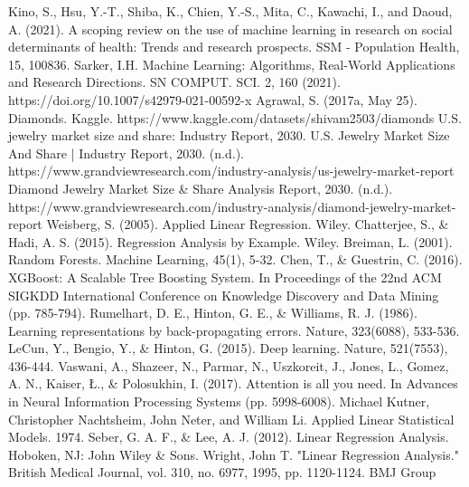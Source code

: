 \documentclass[conference]{IEEEtran}
\begin{document}
\begin{thebibliography}{00}
 Kino, S., Hsu, Y.-T., Shiba, K., Chien, Y.-S., Mita, C., Kawachi, I., and Daoud, A. (2021). A scoping review on the use of machine learning in research on social determinants of health: Trends and research prospects. SSM - Population Health, 15, 100836.
 Sarker, I.H. Machine Learning: Algorithms, Real-World Applications and Research Directions. SN COMPUT. SCI. 2, 160 (2021). https://doi.org/10.1007/s42979-021-00592-x
 Agrawal, S. (2017a, May 25). Diamonds. Kaggle. https://www.kaggle.com/datasets/shivam2503/diamonds 
 U.S. jewelry market size and share: Industry Report, 2030. U.S. Jewelry Market Size And Share | Industry Report, 2030. (n.d.). https://www.grandviewresearch.com/industry-analysis/us-jewelry-market-report 
 Diamond Jewelry Market Size \& Share Analysis Report, 2030. (n.d.). https://www.grandviewresearch.com/industry-analysis/diamond-jewelry-market-report 
 Weisberg, S. (2005). Applied Linear Regression. Wiley.
 Chatterjee, S., \& Hadi, A. S. (2015). Regression Analysis by Example. Wiley.
 Breiman, L. (2001). Random Forests. Machine Learning, 45(1), 5-32.
 Chen, T., \& Guestrin, C. (2016). XGBoost: A Scalable Tree Boosting System. In Proceedings of the 22nd ACM SIGKDD International Conference on Knowledge Discovery and Data Mining (pp. 785-794).
 Rumelhart, D. E., Hinton, G. E., \& Williams, R. J. (1986). Learning representations by back-propagating errors. Nature, 323(6088), 533-536.
 LeCun, Y., Bengio, Y., \& Hinton, G. (2015). Deep learning. Nature, 521(7553), 436-444.
Vaswani, A., Shazeer, N., Parmar, N., Uszkoreit, J., Jones, L., Gomez, A. N., Kaiser, Ł., \& Polosukhin, I. (2017). Attention is all you need. In Advances in Neural Information Processing Systems (pp. 5998-6008).
Michael Kutner, Christopher Nachtsheim, John Neter, and William Li. Applied Linear Statistical Models. 1974.
Seber, G. A. F., \& Lee, A. J. (2012). Linear Regression Analysis. Hoboken, NJ: John Wiley \& Sons. 
 Wright, John T. "Linear Regression Analysis." British Medical Journal, vol. 310, no. 6977, 1995, pp. 1120-1124. BMJ Group
\end{thebibliography}
\vspace{12pt}
\end{document}
